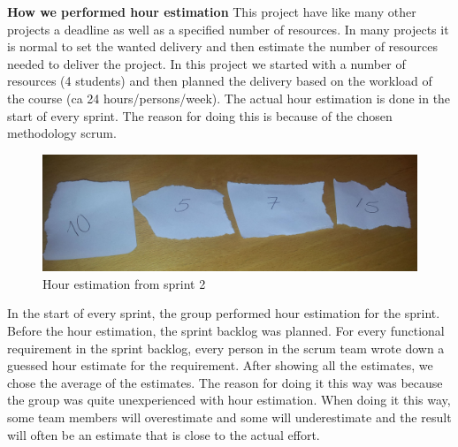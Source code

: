 	{\bf How we performed hour estimation} This project have like many other projects a deadline
	as well as a specified number of resources. In many projects it is normal to set the wanted 
	delivery and then estimate the number of resources needed to deliver the project.
	In this project we started with a number of resources (4 students) and then planned the 
	delivery based on the workload of the course (ca 24 hours/persons/week). The actual 
	hour estimation is done in the start of every sprint. The reason for doing this is because of 
	the chosen methodology scrum.

	\begin{figure}[H]
		\includegraphics[width=1.0\textwidth]{pictures/estimation.jpg}
		\caption{Hour estimation from sprint 2}
	\end{figure}

	In the start of every sprint, the group performed hour estimation for the sprint.
	Before the hour estimation, the sprint backlog was planned. For every functional requirement
	in the sprint backlog, every person in the scrum team wrote down a guessed hour estimate
	for the requirement. After showing all the estimates, we chose the average of
	the estimates. The reason for doing it this way was because the group 
	was quite unexperienced with hour estimation. When doing it this way, some team 
	members will overestimate and some will underestimate and the result will often be an estimate 
	that is close to the actual effort. 
